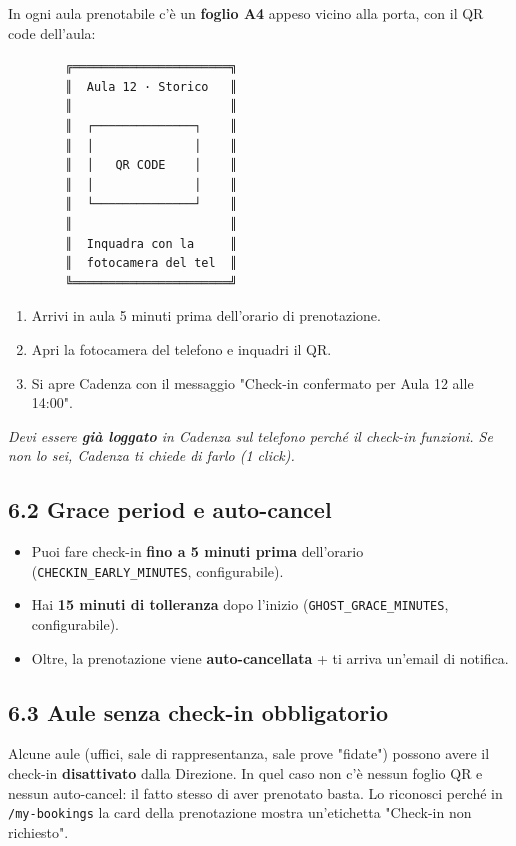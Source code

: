 \documentclass[11pt,a4paper]{article}
\renewenvironment{quote}
  {\begin{list}{}{%
      \setlength{\leftmargin}{8pt}%
      \setlength{\rightmargin}{8pt}%
      \setlength{\topsep}{6pt}%
      \setlength{\parsep}{0pt}}%
      \item\relax\color{black!75}\itshape}
  {\end{list}}
\begin{document}
In ogni aula prenotabile c'è un \textbf{foglio A4} appeso vicino alla porta, con il QR code dell'aula:

\begin{lstlisting}
        ╔══════════════════════╗
        ║  Aula 12 · Storico   ║
        ║                      ║
        ║  ┌──────────────┐    ║
        ║  │              │    ║
        ║  │   QR CODE    │    ║
        ║  │              │    ║
        ║  └──────────────┘    ║
        ║                      ║
        ║  Inquadra con la     ║
        ║  fotocamera del tel  ║
        ╚══════════════════════╝
\end{lstlisting}

\begin{enumerate}
  \item Arrivi in aula 5 minuti prima dell'orario di prenotazione.
  \item Apri la fotocamera del telefono e inquadri il QR.
  \item Si apre Cadenza con il messaggio "Check-in confermato per Aula 12 alle 14:00".
\end{enumerate}

\begin{quote}
Devi essere \textbf{già loggato} in Cadenza sul telefono perché il check-in funzioni. Se non lo sei, Cadenza ti chiede di farlo (1 click).
\end{quote}

\subsection{6.2 Grace period e auto-cancel}


\begin{itemize}
  \item Puoi fare check-in \textbf{fino a 5 minuti prima} dell'orario (\texttt{CHECKIN\_EARLY\_MINUTES}, configurabile).
  \item Hai \textbf{15 minuti di tolleranza} dopo l'inizio (\texttt{GHOST\_GRACE\_MINUTES}, configurabile).
  \item Oltre, la prenotazione viene \textbf{auto-cancellata} + ti arriva un'email di notifica.
\end{itemize}

\subsection{6.3 Aule senza check-in obbligatorio}


Alcune aule (uffici, sale di rappresentanza, sale prove "fidate") possono avere il check-in \textbf{disattivato} dalla Direzione. In quel caso non c'è nessun foglio QR e nessun auto-cancel: il fatto stesso di aver prenotato basta. Lo riconosci perché in \texttt{/my-bookings} la card della prenotazione mostra un'etichetta "Check-in non richiesto".
\end{document}
